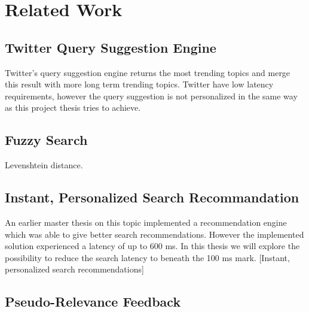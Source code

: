\chapter{Related Work}
\label{ch:related-work}

\section{Twitter Query Suggestion Engine}

Twitter’s query suggestion engine \cite{twitter-suggestion} returns the most trending topics and merge this result with more long term trending topics.
Twitter have low latency requirements, however the query suggestion is not personalized in the same way as this project thesis tries to achieve.

\section{Fuzzy Search}
Levenshtein distance.

\section{Instant, Personalized Search Recommandation}
An earlier master thesis on this topic implemented a recommendation engine which was able to give better search recommendations.
However the implemented solution experienced a latency of up to 600 ms.
In this thesis we will explore the possibility to reduce the search latency to beneath the 100 ms mark. [Instant, personalized search recommendations]

\section{Pseudo-Relevance Feedback}
\cite{pseudo-relevance}
